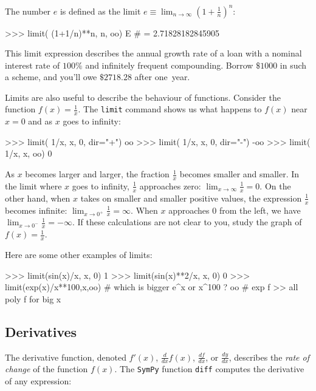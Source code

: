 The number $e$ is defined as the limit
$\displaystyle e \equiv \lim_{n\to \infty} \left( 1 + \frac{1}{n}\right)^{n}$:
\small
\begin{verbatimtab}
>>> limit( (1+1/n)**n, n, oo)
E          # = 2.71828182845905
\end{verbatimtab}
\normalsize

\noindent
This limit expression describes the annual growth rate of a loan with 
a nominal interest rate of $100\%$ and infinitely frequent compounding.
Borrow $\$1000$ in such a scheme, and 
you'll owe $\$2718.28$ after one~year.


Limits are also useful to describe the behaviour of functions.
Consider the function $f(x)=\frac{1}{x}$.
The \texttt{limit} command shows us what happens to $f(x)$ near $x=0$ and as $x$ goes to infinity:

\small
\begin{verbatimtab}
>>> limit( 1/x, x, 0, dir="+")
oo
>>> limit( 1/x, x, 0, dir="-")
-oo
>>> limit( 1/x, x, oo)
0
\end{verbatimtab}
\normalsize

\noindent
As $x$ becomes larger and larger, the fraction $\frac{1}{x}$ becomes smaller and smaller.
In the limit where $x$ goes to infinity, $\frac{1}{x}$ approaches zero: $\lim_{x\to \infty} \frac{1}{x} = 0$. 
On the other hand, when $x$ takes on smaller and smaller positive values,
the expression $\frac{1}{x}$ becomes infinite: $\lim_{x \to 0^+} \frac{1}{x} = \infty$.
When $x$ approaches $0$ from the left, we have $\lim_{x \to 0^-} \frac{1}{x} = -\infty$.
If these calculations are not clear to you,
study the graph of $f(x)=\frac{1}{x}$.


Here are some other examples of limits:

\small
\begin{verbatimtab}
>>> limit(sin(x)/x, x, 0)
1
>>> limit(sin(x)**2/x, x, 0)
0
>>> limit(exp(x)/x**100,x,oo) # which is bigger e^x or x^100 ?
oo                            # exp f >> all poly f for big x  
\end{verbatimtab}
\normalsize


\subsection{Derivatives}
\label{calculus:derivatives}
The derivative function, denoted $f'(x)$, $\frac{d}{dx}f(x)$, $\frac{df}{dx}$, or $\frac{dy}{dx}$, 
describes the \emph{rate of change} of the function $f(x)$.
The \texttt{SymPy} function \texttt{diff} computes the derivative of any expression:



